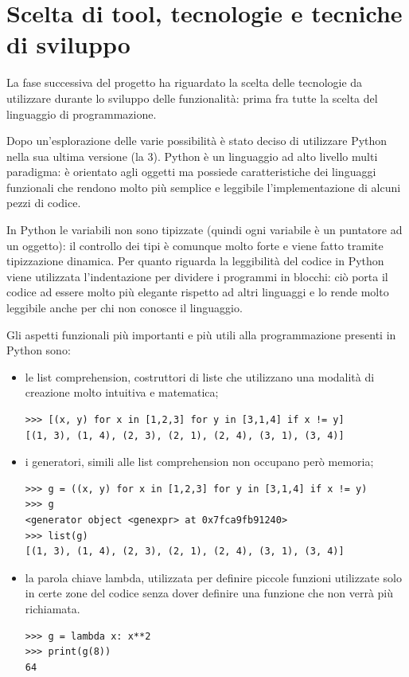 \documentclass[12pt]{report}
\begin{document}
\newpage
\section{Scelta di tool, tecnologie e tecniche di sviluppo}

La fase successiva del progetto ha riguardato la scelta delle tecnologie da utilizzare durante lo sviluppo delle funzionalità: prima fra tutte la scelta del linguaggio di programmazione.

Dopo un'esplorazione delle varie possibilità è stato deciso di utilizzare Python nella sua ultima versione (la 3). Python è un linguaggio ad alto livello multi paradigma: è orientato agli oggetti ma possiede caratteristiche dei linguaggi funzionali che rendono molto più semplice e leggibile l'implementazione di alcuni pezzi di codice.

In Python le variabili non sono tipizzate (quindi ogni variabile è un puntatore ad un oggetto): il controllo dei tipi è comunque molto forte e viene fatto tramite tipizzazione dinamica.
Per quanto riguarda la leggibilità del codice in Python viene utilizzata l'indentazione per dividere i programmi in blocchi: ciò porta il codice ad essere molto più elegante rispetto ad altri linguaggi e lo rende molto leggibile anche per chi non conosce il linguaggio.

Gli aspetti funzionali più importanti e più utili alla programmazione presenti in Python sono:
\begin{itemize}
\item le list comprehension, costruttori di liste che utilizzano una modalità di creazione molto intuitiva e matematica;
\begin{lstlisting}[label=codice,caption=Esempio di List Comprehension, frame=single]
>>> [(x, y) for x in [1,2,3] for y in [3,1,4] if x != y]
[(1, 3), (1, 4), (2, 3), (2, 1), (2, 4), (3, 1), (3, 4)] 
\end{lstlisting}
\item i generatori, simili alle list comprehension non occupano però memoria;
\begin{lstlisting}[label=codice,caption=Esempio di Generatore, frame=single]
>>> g = ((x, y) for x in [1,2,3] for y in [3,1,4] if x != y)
>>> g
<generator object <genexpr> at 0x7fca9fb91240>
>>> list(g)
[(1, 3), (1, 4), (2, 3), (2, 1), (2, 4), (3, 1), (3, 4)]
\end{lstlisting}
\item la parola chiave lambda, utilizzata per definire piccole funzioni utilizzate solo in certe zone del codice senza dover definire una funzione che non verrà più richiamata.
\begin{lstlisting}[label=codice,caption=Esempio di utilizzo della lambda, frame=single]
>>> g = lambda x: x**2
>>> print(g(8))
64
\end{lstlisting}
\end{itemize}  
 
\end{document}
